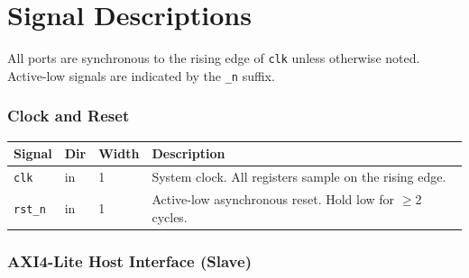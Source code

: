 \documentclass[10pt, a4paper]{article}
\newcommand{\portname}[1]{\texttt{#1}}
\begin{document}
\section{Signal Descriptions}

All ports are synchronous to the rising edge of \portname{clk} unless
otherwise noted. Active-low signals are indicated by the \texttt{\_n} suffix.

\subsubsection*{Clock and Reset}

\renewcommand{\arraystretch}{1.3}
\begin{tabularx}{\linewidth}{L{3cm} C{1.2cm} C{1.4cm} X}
\toprule
\textbf{Signal} & \textbf{Dir} & \textbf{Width} & \textbf{Description} \\
\midrule
{}
\portname{clk}   & in & 1 & System clock. All registers sample on the rising edge. \\
\portname{rst\_n} & in & 1 & Active-low asynchronous reset. Hold low for $\geq$2 cycles. \\
\bottomrule
\end{tabularx}

\subsubsection*{AXI4-Lite Host Interface (Slave)}
\end{document}
